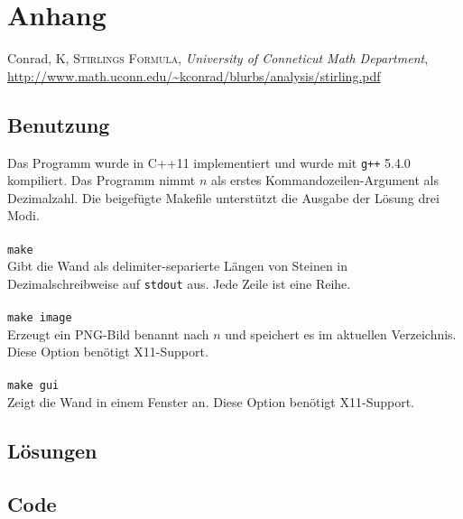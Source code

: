\documentclass[a4paper, 12pt]{scrartcl}
\begin{document}
\section{Anhang}

\begin{thebibliography}{9}
	Conrad, K, \textsc{Stirlings Formula},
	\emph{University of Conneticut Math Department},\\
	\href{http://www.math.uconn.edu/~kconrad/blurbs/analysis/stirling.pdf}{\url{http://www.math.uconn.edu/~kconrad/blurbs/analysis/stirling.pdf}}
\end{thebibliography}

\subsection*{Benutzung}
Das Programm wurde in C++11 implementiert und wurde mit \texttt{g++} 5.4.0 kompiliert. Das Programm nimmt $n$ als erstes Kommandozeilen-Argument als Dezimalzahl. Die beigefügte Makefile unterstützt die Ausgabe der Lösung drei Modi. \\\\
\texttt{make} \\
Gibt die Wand als delimiter-separierte Längen von Steinen in Dezimalschreibweise auf \texttt{stdout} aus. Jede Zeile ist eine Reihe.\\\\
\texttt{make image} \\
Erzeugt ein PNG-Bild benannt nach $n$ und speichert es im aktuellen Verzeichnis. Diese Option benötigt X11-Support.\\\\
\texttt{make gui} \\
Zeigt die Wand in einem Fenster an. Diese Option benötigt X11-Support.\\
\newpage

\newpage
\subsection*{Lösungen}


\newpage
\subsection*{Code}

\end{document}

